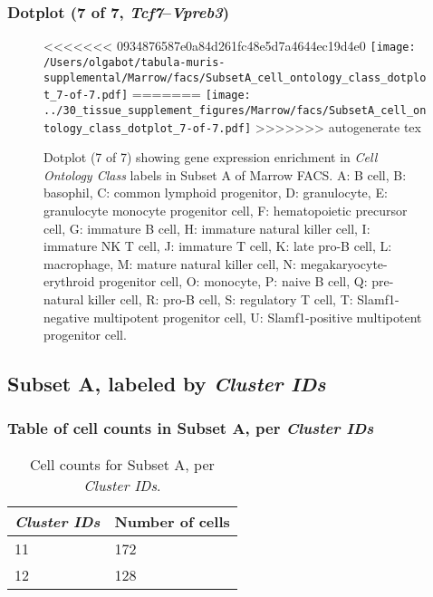 \clearpage

\subsubsection{Dotplot (7 of 7, \emph{Tcf7}--\emph{Vpreb3})}
\begin{figure}[h]
\centering
<<<<<<< 0934876587e0a84d261fc48e5d7a4644ec19d4e0
\texttt{[image: /Users/olgabot/tabula-muris-supplemental/Marrow/facs/SubsetA\_cell\_ontology\_class\_dotplot\_7-of-7.pdf]}
=======
\texttt{[image: ../30\_tissue\_supplement\_figures/Marrow/facs/SubsetA\_cell\_ontology\_class\_dotplot\_7-of-7.pdf]}
>>>>>>> autogenerate tex

\caption{ Dotplot (7 of 7)  showing gene expression enrichment in \emph{Cell Ontology Class} labels in Subset A of Marrow FACS. A: B cell, B: basophil, C: common lymphoid progenitor, D: granulocyte, E: granulocyte monocyte progenitor cell, F: hematopoietic precursor cell, G: immature B cell, H: immature natural killer cell, I: immature NK T cell, J: immature T cell, K: late pro-B cell, L: macrophage, M: mature natural killer cell, N: megakaryocyte-erythroid progenitor cell, O: monocyte, P: naive B cell, Q: pre-natural killer cell, R: pro-B cell, S: regulatory T cell, T: Slamf1-negative multipotent progenitor cell, U: Slamf1-positive multipotent progenitor cell.}
\end{figure}


\clearpage

\subsection{Subset A, labeled by \emph{Cluster IDs}}
\subsubsection{Table of cell counts in Subset A, per \emph{Cluster IDs}}\begin{table}[h]
\centering
\label{my-label}
\begin{tabular}{@{}ll@{}}
\toprule

\emph{Cluster IDs}& Number of cells \\ \midrule
11 & 172 \\

12 & 128 \\
\bottomrule
\end{tabular}
\caption{Cell counts for Subset A, per \emph{Cluster IDs}.}
\end{table}

